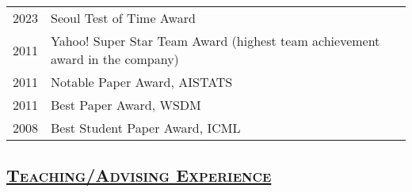 \documentclass[10pt,twoside,letterpaper]{article}
\newcommand{\tabrowsep}{\vspace{1mm}}
\begin{document}
\begin{center}
\begin{tabular}{p{10mm} p{140mm}}
2023 & {Seoul Test of Time Award} \\
2011 & {Yahoo! Super Star Team Award} (highest team achievement award in the company) \tabrowsep \\
2011 & {Notable Paper Award, AISTATS} \tabrowsep \\
2011 & {Best Paper Award, WSDM} \tabrowsep \\
2008 & {Best Student Paper Award, ICML} \tabrowsep \\
\end{tabular}
\end{center}

\subsection*{\textsc{\underline{Teaching/Advising Experience}}}
\end{document}
